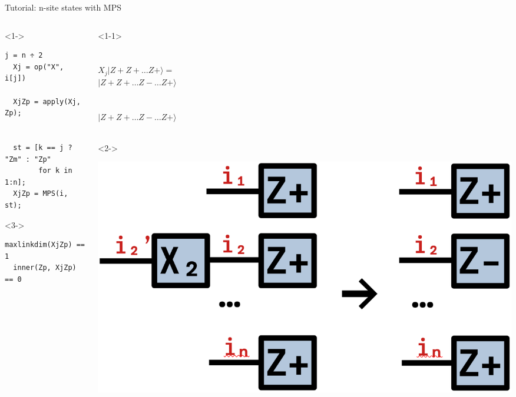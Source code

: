 \begin{frame}[fragile]{Tutorial: n-site states with MPS}

\begin{columns}

\begin{column}{6cm}

\begin{onlyenv}<1->
\begin{lstlisting}[language=JuliaLocal, style=julia, mathescape, basicstyle=\scriptsize\ttfamily]
  j = n ÷ 2
  Xj = op("X", i[j])

  XjZp = apply(Xj, Zp);


  st = [k == j ? "Zm" : "Zp"
        for k in 1:n];
  XjZp = MPS(i, st);
\end{lstlisting}
\end{onlyenv}

\begin{onlyenv}<3->
\begin{lstlisting}[language=JuliaLocal, style=julia, mathescape, basicstyle=\scriptsize\ttfamily]
  maxlinkdim(XjZp) == 1
  inner(Zp, XjZp) == 0
\end{lstlisting}
\end{onlyenv}

\end{column}

\begin{column}{4.5cm}

\begin{onlyenv}<1-1>
~\\
~\\
~\\
$X_j|Z+Z+\dots Z+\rangle =$ \\
$|Z+Z+\dots Z-\dots Z+\rangle$ \\
~\\
~\\
$|Z+Z+\dots Z-\dots Z+\rangle$ \\
~\\
\end{onlyenv}

\begin{onlyenv}<2->
\vspace*{0.0cm}
\begin{center}
\includegraphics[width=1.0\textwidth]{
  slides/assets/XjZpn.png
}
\end{center}
\vspace*{0.0cm}
\end{onlyenv}


\end{column}
\end{columns}
\end{frame}
